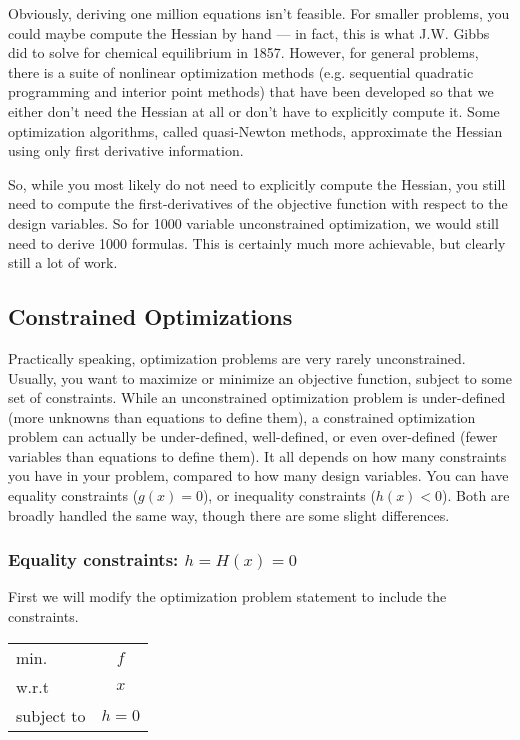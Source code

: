 \documentclass[conf]{new-aiaa}
\begin{document}
    Obviously, deriving one million equations isn't feasible. 
    For smaller problems, you could maybe compute the Hessian by hand --- in fact, this is what J.W. Gibbs did to solve for chemical equilibrium in 1857.
    However, for general problems, there is a suite of nonlinear optimization methods (e.g. sequential quadratic programming and interior point methods) that have been developed so that we either don't need the Hessian at all or don't have to explicitly compute it. 
    Some optimization algorithms, called quasi-Newton methods, approximate the Hessian using only first derivative information.

    So, while you most likely do not need to explicitly compute the Hessian, you still need to compute the first-derivatives of the objective function with respect to the design variables. 
    So for 1000 variable unconstrained optimization, we would still need to derive 1000 formulas. 
    This is certainly much more achievable, but clearly still a lot of work. 

    \subsection{Constrained Optimizations}
        
    Practically speaking, optimization problems are very rarely unconstrained. 
    Usually, you want to maximize or minimize an objective function, subject to some set of constraints. 
    While an unconstrained optimization problem is under-defined (more unknowns than equations to define them), 
    a constrained optimization problem can actually be under-defined, well-defined, or even over-defined (fewer variables than equations to define them). 
    It all depends on how many constraints you have in your problem, compared to how many design variables. 
    You can have equality constraints ($g(x) = 0$), or inequality constraints ($h(x) < 0$). 
    Both are broadly handled the same way, though there are some slight differences. 


        \subsubsection{Equality constraints: $h = H(x) = 0$}
        First we will modify the optimization problem statement to include the constraints. 
        \begin{table}[H]
            \centering
            \begin{tabular}{lc}
                \hline
                min. & $f$ \\
                w.r.t & $x$ \\ 
                subject to & $h = 0$ \\ \hline 
            \end{tabular}
        \end{table}
\end{document}

